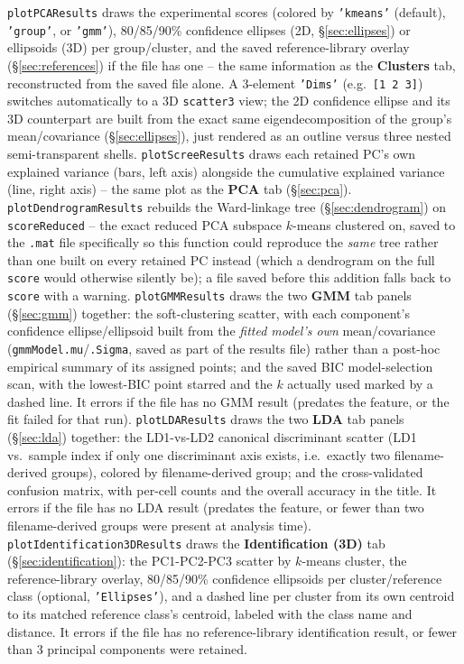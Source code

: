 \documentclass[11pt,a4paper]{article}
\newcommand{\code}[1]{\texttt{#1}}
\begin{document}
\code{plotPCAResults} draws the experimental scores (colored by
\code{'kmeans'} (default), \code{'group'}, or \code{'gmm'}), 80/85/90\%
confidence ellipses (2D, \S\ref{sec:ellipses}) or ellipsoids (3D) per
group/cluster, and the saved reference-library overlay
(\S\ref{sec:references}) if the file has one -- the same information as
the \textbf{Clusters} tab, reconstructed from the saved file alone. A
3-element \code{'Dims'} (e.g.\ \code{[1 2 3]}) switches automatically to a
3D \code{scatter3} view; the 2D confidence ellipse and its 3D counterpart
are built from the exact same eigendecomposition of the group's
mean/covariance (\S\ref{sec:ellipses}), just rendered as an outline versus
three nested semi-transparent shells. \code{plotScreeResults} draws each
retained PC's own explained variance (bars, left axis) alongside the
cumulative explained variance (line, right axis) -- the same plot as the
\textbf{PCA} tab (\S\ref{sec:pca}). \code{plotDendrogramResults} rebuilds
the Ward-linkage tree (\S\ref{sec:dendrogram}) on \code{scoreReduced} --
the exact reduced PCA subspace $k$-means clustered on, saved to the
\code{.mat} file specifically so this function could reproduce the
\emph{same} tree rather than one built on every retained PC instead
(which a dendrogram on the full \code{score} would otherwise silently
be); a file saved before this addition falls back to \code{score} with a
warning. \code{plotGMMResults} draws the two \textbf{GMM} tab panels
(\S\ref{sec:gmm}) together: the soft-clustering scatter, with each
component's confidence ellipse/ellipsoid built from the \emph{fitted
model's own} mean/covariance (\code{gmmModel.mu}/\code{.Sigma}, saved as
part of the results file) rather than a post-hoc empirical summary of its
assigned points; and the saved BIC model-selection scan, with the
lowest-BIC point starred and the $k$ actually used marked by a dashed
line. It errors if the file has no GMM result (predates the feature, or
the fit failed for that run). \code{plotLDAResults} draws the two
\textbf{LDA} tab panels (\S\ref{sec:lda}) together: the LD1-vs-LD2
canonical discriminant scatter (LD1 vs.\ sample index if only one
discriminant axis exists, i.e.\ exactly two filename-derived groups),
colored by filename-derived group; and the cross-validated confusion
matrix, with per-cell counts and the overall accuracy in the title. It
errors if the file has no LDA result (predates the feature, or fewer than
two filename-derived groups were present at analysis time).
\code{plotIdentification3DResults} draws the \textbf{Identification (3D)}
tab (\S\ref{sec:identification}): the PC1-PC2-PC3 scatter by $k$-means
cluster, the reference-library overlay, 80/85/90\% confidence ellipsoids
per cluster/reference class (optional, \code{'Ellipses'}), and a dashed
line per cluster from its own centroid to its matched reference class's
centroid, labeled with the class name and distance. It errors if the
file has no reference-library identification result, or fewer than 3
principal components were retained.
\end{document}
